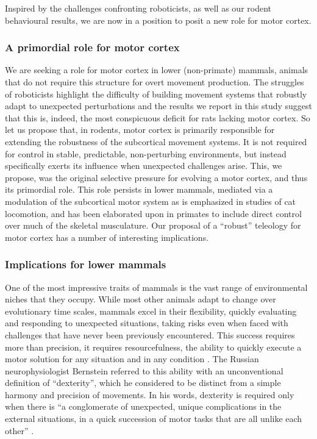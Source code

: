 Inspired by the challenges confronting roboticists, as well as our rodent behavioural results, we are now in a position to posit a new role for motor cortex.

\subsubsection*{A primordial role for motor cortex}

We are seeking a role for motor cortex in lower (non-primate) mammals, animals that do not require this structure for overt movement production. The struggles of roboticists highlight the difficulty of building movement systems that robustly adapt to unexpected perturbations and the results we report in this study suggest that this is, indeed, the most conspicuous deficit for rats lacking motor cortex. So let us propose that, in rodents, motor cortex is primarily responsible for extending the robustness of the subcortical movement systems. It is not required for control in stable, predictable, non-perturbing environments, but instead specifically exerts its influence when unexpected challenges arise. This, we propose, was the original selective pressure for evolving a motor cortex, and thus its primordial role. This role persists in lower mammals, mediated via a modulation of the subcortical motor system as is emphasized in studies of cat locomotion, and has been elaborated upon in primates to include direct control over much of the skeletal musculature. Our proposal of a ``robust'' teleology for motor cortex has a number of interesting implications.

\subsubsection*{Implications for lower mammals}

One of the most impressive traits of mammals is the vast range of environmental niches that they occupy. While most other animals adapt to change over evolutionary time scales, mammals excel in their flexibility, quickly evaluating and responding to unexpected situations, taking risks even when faced with challenges that have never been previously encountered. This success requires more than precision, it requires resourcefulness, the ability to quickly execute a motor solution for any situation and in any condition \cite{Bernstein1996}. The Russian neurophysiologist Bernstein referred to this ability with an unconventional definition of ``dexterity'', which he considered to be distinct from a simple harmony and precision of movements. In his words, dexterity is required only when there is \enquote{a conglomerate of unexpected, unique complications in the external situations, in a quick succession of motor tasks that are all unlike each other} \cite{Bernstein1996}.

